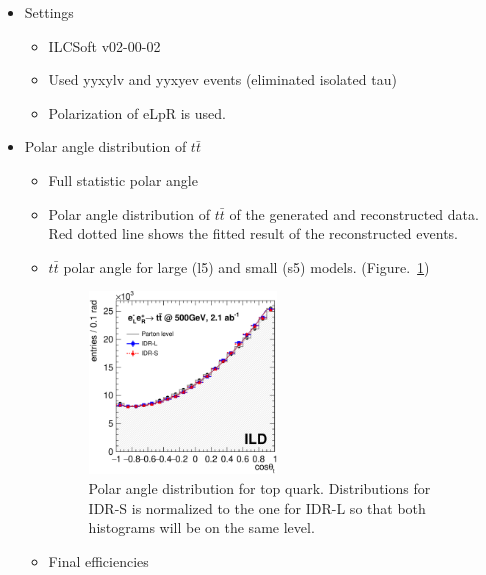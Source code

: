 \documentclass[preprint]{elsarticle}
\begin{document}
\begin{itemize}

\item Settings
  \begin{itemize}
  \item ILCSoft v02-00-02
  \item Used yyxylv and yyxyev events (eliminated isolated tau)
  \item Polarization of eLpR is used.
  \end{itemize}
  
\item Polar angle distribution of $t\bar{t}$
  \begin{itemize}
  \item Full statistic polar angle
  \item Polar angle distribution of $t\bar{t}$ of the generated and reconstructed data. Red dotted line shows the fitted result of the reconstructed events.
  \item $t\bar{t}$ polar angle for large (l5) and small (s5) models. (Figure.~\ref{compare})
      
  \begin{figure}[h!]
    \centering
    \includegraphics[width=0.5\textwidth]{figures_TTbar/results2models_t.eps} 
    \caption{Polar angle distribution for top quark. Distributions for IDR-S is normalized to the one for IDR-L so that both histograms will be on the same level. }
    \label{compare}
  \end{figure}

    \item Final efficiencies
    

\end{itemize}
\end{itemize}
\end{document}
